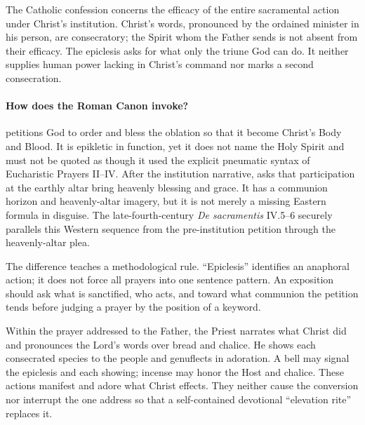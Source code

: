 The Catholic confession concerns the efficacy of the entire sacramental action under Christ's institution. Christ's words, pronounced by the ordained minister in his person, are consecratory; the Spirit whom the Father sends is not absent from their efficacy. The epiclesis asks for what only the triune God can do. It neither supplies human power lacking in Christ's command nor marks a second consecration.

\paragraph{How does the Roman Canon invoke?}
 petitions God to order and bless the oblation so that it become Christ's Body and Blood. It is epikletic in function, yet it does not name the Holy Spirit and must not be quoted as though it used the explicit pneumatic syntax of Eucharistic Prayers II--IV\@. After the institution narrative,  asks that participation at the earthly altar bring heavenly blessing and grace. It has a communion horizon and heavenly-altar imagery, but it is not merely a missing Eastern formula in disguise. The late-fourth-century \emph{De sacramentis} IV.5--6 securely parallels this Western sequence from the pre-institution petition through the heavenly-altar plea.

The difference teaches a methodological rule. ``Epiclesis'' identifies an anaphoral action; it does not force all prayers into one sentence pattern. An exposition should ask what is sanctified, who acts, and toward what communion the petition tends before judging a prayer by the position of a keyword.


Within the prayer addressed to the Father, the Priest narrates what Christ did and pronounces the Lord's words over bread and chalice. He shows each consecrated species to the people and genuflects in adoration. A bell may signal the epiclesis and each showing; incense may honor the Host and chalice. These actions manifest and adore what Christ effects. They neither cause the conversion nor interrupt the one address so that a self-contained devotional ``elevation rite'' replaces it.

